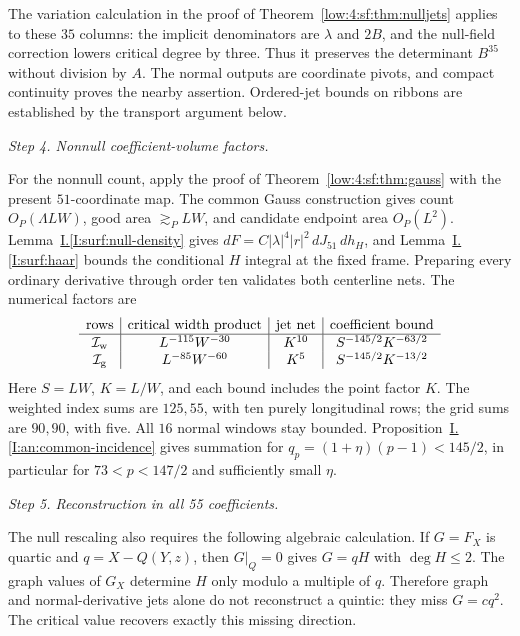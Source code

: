 \documentclass[11pt]{amsart}
\theoremstyle{definition}
\theoremstyle{remark}
\numberwithin{equation}{section}
\newcommand{\partIref}[1]{\hyperref[I:#1]{I.\ref*{I:#1}}}
\begin{document}
The variation calculation in the proof of Theorem~\ref{low:4:sf:thm:nulljets} applies to these $35$ columns: the implicit denominators are $\lambda$ and $2B$, and the null-field correction lowers critical degree by three. Thus it preserves the determinant $B^{35}$ without division by $A$. The normal outputs are coordinate pivots, and compact continuity proves the nearby assertion. Ordered-jet bounds on ribbons are established by the transport argument below.

\par\smallskip\noindent\textit{Step 4. Nonnull coefficient-volume factors.}\par\nobreak\smallskip

For the nonnull count, apply the proof of Theorem~\ref{low:4:sf:thm:gauss} with the present $51$-coordinate map. The common Gauss construction gives count $O_P(\Lambda LW)$, good area $\gtrsim_PLW$, and candidate endpoint area $O_P(L^2)$. Lemma~\partIref{surf:null-density} gives $dF=C|\lambda|^4|r|^2\,dJ_{51}\,dh_H$, and Lemma~\partIref{surf:haar} bounds the conditional $H$ integral at the fixed frame. Preparing every ordinary derivative through order ten validates both centerline nets. The numerical factors are
\[
\begin{array}{c|c|c|c}
\text{rows}&\text{critical width product}&\text{jet net}&\text{coefficient bound}\\\hline
\mathcal I_{\rm w}&L^{-115}W^{-30}&K^{10}&S^{-145/2}K^{-63/2}\\
\mathcal I_{\rm g}&L^{-85}W^{-60}&K^5&S^{-145/2}K^{-13/2}
\end{array}
\]
Here $S=LW$, $K=L/W$, and each bound includes the point factor $K$. The weighted index sums are $125,55$, with ten purely longitudinal rows; the grid sums are $90,90$, with five. All $16$ normal windows stay bounded. Proposition~\partIref{an:common-incidence} gives summation for $q_p=(1+\eta)(p-1)<145/2$, in particular for $73<p<147/2$ and sufficiently small $\eta$.

\par\smallskip\noindent\textit{Step 5. Reconstruction in all 55 coefficients.}\par\nobreak\smallskip

The null rescaling also requires the following algebraic calculation. If $G=F_X$ is quartic and $q=X-Q(Y,z)$, then $G|_Q=0$ gives $G=qH$ with $\deg H\le2$. The graph values of $G_X$ determine $H$ only modulo a multiple of $q$. Therefore graph and normal-derivative jets alone do not reconstruct a quintic: they miss $G=cq^2$. The critical value recovers exactly this missing direction.
\end{document}
